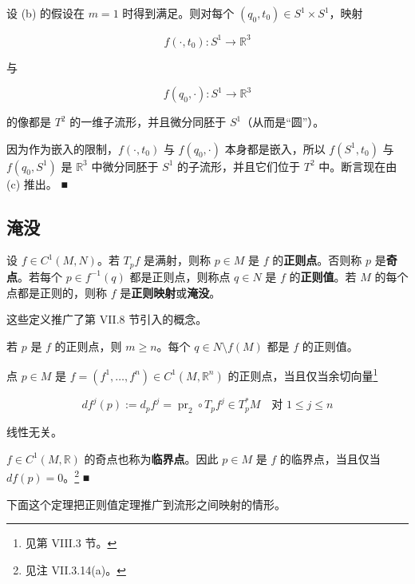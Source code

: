 \begin{example}
\begin{items}
设 (b) 的假设在 $ m = 1 $ 时得到满足。则对每个 $ (q_0, t_0) \in S^1 \times S^1 $，映射

\[
f(\cdot, t_0): S^1 \to \mathbb{R}^3
\]

与

\[
f(q_0, \cdot): S^1 \to \mathbb{R}^3
\]

的像都是 $ T^2 $ 的一维子流形，并且微分同胚于 $ S^1 $（从而是“圆”）。

\end{items}


\proofhead
因为作为嵌入的限制，$ f(\cdot, t_0) $ 与 $ f(q_0, \cdot) $ 本身都是嵌入，所以 $ f(S^1, t_0) $ 与 $ f(q_0, S^1) $ 是 $ \mathbb{R}^3 $ 中微分同胚于 $ S^1 $ 的子流形，并且它们位于 $ T^2 $ 中。断言现在由 (c) 推出。 \nobreak\hspace{0.35em}■
\end{example}

\subsection*{淹没}

设 $ f \in C^1(M, N) $。若 $ T_p f $ 是满射，则称 $ p \in M $ 是 $ f $ 的\textbf{正则点}。否则称 $ p $ 是\textbf{奇点}。若每个 $ p \in f^{-1}(q) $ 都是正则点，则称点 $ q \in N $ 是 $ f $ 的\textbf{正则值}。若 $ M $ 的每个点都是正则的，则称 $ f $ 是\textbf{正则映射}或\textbf{淹没}。

这些定义推广了第 VII.8 节引入的概念。

\begin{remark}

\begin{items}
\item

若 $ p $ 是 $ f $ 的正则点，则 $ m \ge n $。每个 $ q \in N \setminus f(M) $ 都是 $ f $ 的正则值。

\item

点 $ p \in M $ 是 $ f = (f^1, \ldots, f^n) \in C^1(M, \mathbb{R}^n) $ 的正则点，当且仅当余切向量\footnote{见第 VIII.3 节。}

\[
df^j(p) := d_p f^j = \operatorname{pr}_2 \circ T_p f^j \in T_p^* M \quad \text{对 } 1 \le j \le n
\]

线性无关。

\item

$ f \in C^1(M, \mathbb{R}) $ 的奇点也称为\textbf{临界点}。因此 $ p \in M $ 是 $ f $ 的临界点，当且仅当 $ df(p) = 0 $。\footnote{见注 VII.3.14(a)。} \nobreak\hspace{0.35em}■

\end{items}

下面这个定理把正则值定理推广到流形之间映射的情形。

\end{remark}

